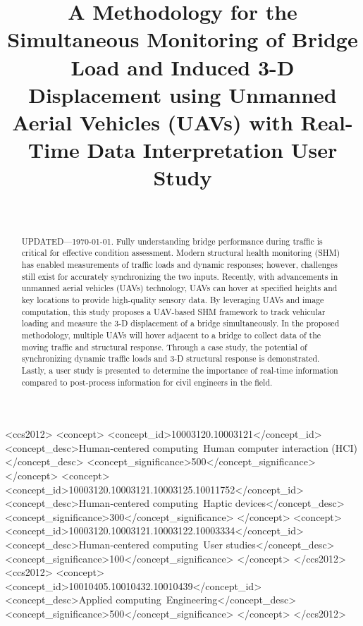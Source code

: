 \documentclass{sigchi}
\def\plaintitle{A Methodology for the Simultaneous Monitoring of Bridge Load and Induced 3-D Displacement using Unmanned Aerial Vehicles (UAVs) with Real-Time Data Interpretation User Study}
\begin{document}
\title{\plaintitle}
\author{
  \\}

\maketitle

\begin{abstract}
    UPDATED---\today. Fully understanding bridge performance during traffic is critical for effective condition assessment. Modern structural health monitoring (SHM) has enabled measurements of traffic loads and dynamic responses; however, challenges still exist for accurately synchronizing the two inputs. Recently, with advancements in unmanned aerial vehicles (UAVs) technology, UAVs can hover at specified heights and key locations to provide high-quality sensory data. By leveraging UAVs and image computation, this study proposes a UAV-based SHM framework to track vehicular loading and measure the 3-D displacement of a bridge simultaneously. In the proposed methodology, multiple UAVs will hover adjacent to a bridge to collect data of the moving traffic and structural response. Through a case study, the potential of synchronizing dynamic traffic loads and 3-D structural response is demonstrated. Lastly, a user study is presented to determine the importance of real-time information compared to post-process information for civil engineers in the field. 
\end{abstract}


\begin{CCSXML}
<ccs2012>
<concept>
<concept_id>10003120.10003121</concept_id>
<concept_desc>Human-centered computing~Human computer interaction (HCI)</concept_desc>
<concept_significance>500</concept_significance>
</concept>
<concept>
<concept_id>10003120.10003121.10003125.10011752</concept_id>
<concept_desc>Human-centered computing~Haptic devices</concept_desc>
<concept_significance>300</concept_significance>
</concept>
<concept>
<concept_id>10003120.10003121.10003122.10003334</concept_id>
<concept_desc>Human-centered computing~User studies</concept_desc>
<concept_significance>100</concept_significance>
</concept>
</ccs2012>
<ccs2012>
<concept>
<concept_id>10010405.10010432.10010439</concept_id>
<concept_desc>Applied computing~Engineering</concept_desc>
<concept_significance>500</concept_significance>
</concept>
</ccs2012>
\end{CCSXML}
\end{document}
